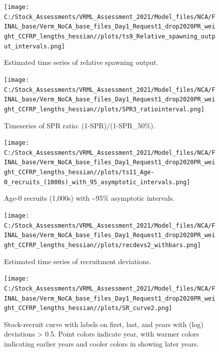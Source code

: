 \documentclass[
  english,
  a4paper,
]{article}
\begin{document}
\FloatBarrier

\FloatBarrier

\begin{figure}
\centering
\texttt{[image: C:/Stock\_Assessments/VRML\_Assessment\_2021/Model\_files/NCA/FINAL\_base/Verm\_NoCA\_base\_files\_Day1\_Request1\_drop2020PR\_weight\_CCFRP\_lengths\_hessian//plots/ts9\_Relative\_spawning\_output\_intervals.png]}
\caption{Estimated time series of relative spawning output.\label{fig:depl}}
\end{figure}

\FloatBarrier

\begin{figure}
\centering
\texttt{[image: C:/Stock\_Assessments/VRML\_Assessment\_2021/Model\_files/NCA/FINAL\_base/Verm\_NoCA\_base\_files\_Day1\_Request1\_drop2020PR\_weight\_CCFRP\_lengths\_hessian//plots/SPR3\_ratiointerval.png]}
\caption{Timeseries of SPR ratio: (1-SPR)/(1-SPR\_50\%).\label{fig:1-spr}}
\end{figure}

\begin{figure}
\centering
\texttt{[image: C:/Stock\_Assessments/VRML\_Assessment\_2021/Model\_files/NCA/FINAL\_base/Verm\_NoCA\_base\_files\_Day1\_Request1\_drop2020PR\_weight\_CCFRP\_lengths\_hessian//plots/ts11\_Age-0\_recruits\_(1000s)\_with\_95\_asymptotic\_intervals.png]}
\caption{Age-0 recruits (1,000s) with \textasciitilde95\% asymptotic intervals.\label{fig:recruits}}
\end{figure}

\begin{figure}
\centering
\texttt{[image: C:/Stock\_Assessments/VRML\_Assessment\_2021/Model\_files/NCA/FINAL\_base/Verm\_NoCA\_base\_files\_Day1\_Request1\_drop2020PR\_weight\_CCFRP\_lengths\_hessian//plots/recdevs2\_withbars.png]}
\caption{Estimated time series of recruitment deviations.\label{fig:recdevs}}
\end{figure}

\begin{figure}
\centering
\texttt{[image: C:/Stock\_Assessments/VRML\_Assessment\_2021/Model\_files/NCA/FINAL\_base/Verm\_NoCA\_base\_files\_Day1\_Request1\_drop2020PR\_weight\_CCFRP\_lengths\_hessian//plots/SR\_curve2.png]}
\caption{Stock-recruit curve with labels on first, last, and years with (log) deviations \textgreater{} 0.5. Point colors indicate year, with warmer colors indicating earlier years and cooler colors in showing later years.\label{fig:bh-curve}}
\end{figure}
\end{document}
